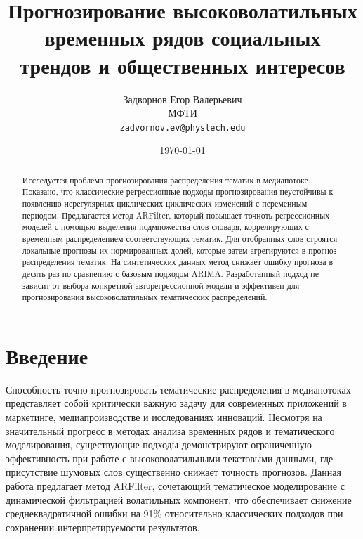 \documentclass[14pt,a4paper]{article}
\title{Прогнозирование высоковолатильных временных рядов социальных трендов и общественных интересов}
\author{
  Задворнов Егор Валерьевич \\
  МФТИ \\
  \texttt{zadvornov.ev@phystech.edu} \\
\date{\today}
}
\begin{document}




% 
\setcounter{page}{2}

\begin{abstract}
Исследуется проблема прогнозирования распределения тематик в медиапотоке. Показано, что классические регрессионные подходы прогнозирования неустойчивы к появлению нерегулярных циклических циклических изменений с переменным периодом. Предлагается метод ARFilter, который повышает точноть регрессионных моделей с помощью выделения подмножества слов словаря, коррелирующих с временным распределением соответствующих тематик. Для отобранных слов строятся локальные прогнозы их нормированных долей, которые затем агрегируются в прогноз распределения тематик. На синтетических данных метод снижает ошибку прогноза в десять раз по сравнению с базовым подходом ARIMA. Разработанный подход не зависит от выбора конкретной авторегрессионной модели и эффективен для прогнозирования высоковолатильных тематических распределений.
\end{abstract}




\newpage
\tableofcontents
\clearpage %


\newpage
\section{Введение}
Способность точно прогнозировать тематические распределения в медиапотоках представляет собой критически важную задачу для современных приложений в маркетинге, медиапроизводстве и исследованиях инноваций. Несмотря на значительный прогресс в методах анализа временных рядов и тематического моделирования, существующие подходы демонстрируют ограниченную эффективность при работе с высоковолатильными текстовыми данными, где присутствие шумовых слов существенно снижает точность прогнозов. Данная работа предлагает метод ARFilter, сочетающий тематическое моделирование с динамической фильтрацией волатильных компонент, что обеспечивает снижение среднеквадратичной ошибки на 91\% относительно классических подходов при сохранении интерпретируемости результатов.
\end{document}
